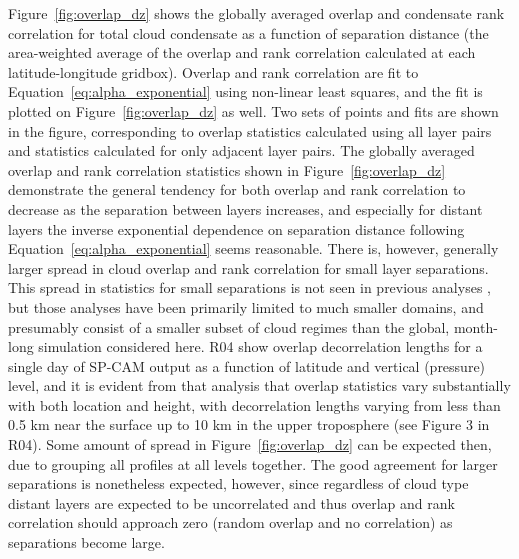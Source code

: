 Figure~\ref{fig:overlap_dz} shows the globally averaged overlap and
condensate rank correlation for total cloud condensate as a function of
separation distance (the area-weighted average of the overlap and rank
correlation calculated at each latitude-longitude gridbox). Overlap and
rank correlation are fit to Equation~\ref{eq:alpha_exponential} using
non-linear least squares, and the fit is plotted on
Figure~\ref{fig:overlap_dz} as well. Two sets of points and fits are
shown in the figure, corresponding to overlap statistics calculated
using all layer pairs and statistics calculated for only adjacent layer
pairs. The globally averaged overlap and rank correlation statistics
shown in Figure~\ref{fig:overlap_dz} demonstrate the general tendency
for both overlap and rank correlation to decrease as the separation
between layers increases, and especially for distant layers the inverse
exponential dependence on separation distance following
Equation~\ref{eq:alpha_exponential} seems reasonable. There is, however,
generally larger spread in cloud overlap and rank correlation for small
layer separations. This spread in statistics for small separations is
not seen in previous analyses \citep[e.g.,][]{pincus_et_al_2005}, but
those analyses have been primarily limited to much smaller domains, and
presumably consist of a smaller subset of cloud regimes than the global,
month-long simulation considered here. R04 show overlap decorrelation
lengths for a single day of SP-CAM output as a function of latitude and
vertical (pressure) level, and it is evident from that analysis that
overlap statistics vary substantially with both location and height,
with decorrelation lengths varying from less than 0.5 km near the
surface up to 10 km in the upper troposphere (see Figure 3 in R04). Some
amount of spread in Figure~\ref{fig:overlap_dz} can be expected then,
due to grouping all profiles at all levels together. The good agreement
for larger separations is nonetheless expected, however, since
regardless of cloud type distant layers are expected to be uncorrelated
and thus overlap and rank correlation should approach zero (random
overlap and no correlation) as separations become large.

